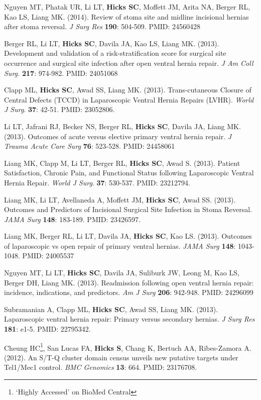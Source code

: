 \documentclass[10pt]{article}
\begin{document}
\begin{enumerate}[label= {[\arabic*]}]
\item Nguyen MT, Phatak UR, Li LT, {\bf Hicks SC}, Moffett JM, Arita NA, Berger RL, Kao LS, Liang MK. (2014). Review of stoma site and midline incisional hernias after stoma reversal. {\it J Surg Res} {\bf 190}: 504-509. PMID: 24560428 
\item Berger RL, Li LT, {\bf Hicks SC}, Davila JA, Kao LS, Liang MK. (2013). Development and validation of a risk-stratification score for surgical site occurrence and surgical site infection after open ventral hernia repair. {\it J Am Coll Surg.} {\bf 217}: 974-982. PMID: 24051068
\item Clapp ML, \textbf{Hicks SC}, Awad SS, Liang MK. (2013). Trans-cutaneous Closure of Central Defects (TCCD) in Laparoscopic Ventral Hernia Repairs (LVHR). {\it World J Surg}. {\bf 37}: 42-51. PMID: 23052806.
\item Li LT, Jafrani RJ, Becker NS, Berger RL,  {\bf Hicks SC}, Davila JA, Liang MK. (2013). Outcomes of acute versus elective primary ventral hernia repair. {\it J Trauma Acute Care Surg} {\bf 76}: 523-528. PMID: 24458061
\item Liang MK, Clapp M, Li LT, Berger RL, {\bf Hicks SC}, Awad S. (2013). Patient Satisfaction, Chronic Pain, and Functional Status following Laparoscopic Ventral Hernia Repair. {\it World J Surg}. {\bf 37}: 530-537. PMID: 23212794. 
\item Liang MK, Li LT, Avellaneda A, Moffett JM, {\bf Hicks SC}, Awad SS. (2013). Outcomes and Predictors of Incisional Surgical Site Infection in Stoma Reversal. {\it JAMA Surg} {\bf 148}: 183-189. PMID: 23426597. 
\item Liang MK, Berger RL, Li LT, Davila JA, {\bf Hicks SC}, Kao LS. (2013). Outcomes of laparoscopic vs open repair of primary ventral hernias. {\it JAMA Surg} {\bf 148}: 1043-1048. PMID: 24005537 
\item Nguyen MT, Li LT, {\bf Hicks SC}, Davila JA, Suliburk JW, Leong M, Kao LS, Berger DH, Liang MK. (2013). Readmission following open ventral hernia repair: incidence, indications, and predictors. {\it Am J Surg} {\bf 206}: 942-948. PMID: 24296099
\item Subramanian A, Clapp ML, {\bf Hicks SC}, Awad SS, Liang MK. (2013). Laparoscopic ventral hernia repair: Primary versus secondary hernias. {\it J Surg Res} {\bf 181}: e1-5. PMID: 22795342.
\item Cheung HC\footnote{ `Highly Accessed' on BioMed Central}, San Lucas FA, \textbf{Hicks S}, Chang K, Bertuch AA, Ribes-Zamora A. (2012). An S/T-Q cluster domain census unveils new putative targets under Tel1/Mec1 control. {\it BMC Genomics} {\bf 13}: 664. PMID: 23176708. 

\end{enumerate}
\end{document}
